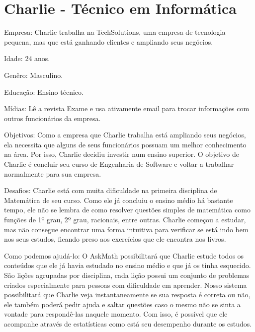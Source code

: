 \label{ap:personas}

\section{Charlie - Técnico em Informática}

\begin{figure}[h!]
  \centering
\end{figure}

Empresa: Charlie trabalha na TechSolutions, uma empresa de tecnologia pequena, mas que está ganhando
clientes e ampliando seus negócios.

Idade: 24 anos.

Genêro: Masculino.

Educação: Ensino técnico.

Mídias: Lê a revista Exame e usa ativamente email para trocar informações com 
outros funcionários da empresa.

Objetivos: Como a empresa que Charlie trabalha está ampliando seus negócios, ela
necessita que alguns de seus funcionários possuam um melhor conhecimento na 
área. Por isso, Charlie decidiu investir num ensino superior. O objetivo de Charlie é 
concluir seu curso de Engenharia de Software e voltar a trabalhar normalmente para sua empresa.

Desafios: Charlie está com muita dificuldade na primeira disciplina de Matemática de seu curso. Como ele já concluiu o ensino médio há bastante tempo, ele não se lembra de como resolver 
questões simples de matemática como funções de 1º grau, 2º grau, racionais, entre outras. Charlie começou a estudar, mas não consegue encontrar uma forma intuitiva para verificar se está indo bem nos 
seus estudos, ficando preso aos exercícios que ele encontra nos livros.

Como podemos ajudá-lo: O AskMath possibilitará que Charlie estude 
todos os conteúdos que ele j\'a havia estudado no ensino médio e que já os tinha esquecido. São lições agrupadas por disciplina, cada lição possui um conjunto de problemas criados especialmente para 
pessoas com dificuldade em aprender. Nosso sistema possibilitará que Charlie veja instantaneamente se sua resposta é correta ou não, ele também poderá pedir ajuda 
e saltar quest\~oes caso o mesmo não se sinta a vontade para respondê-las naquele 
momento. Com isso, é possível que ele acompanhe através de estatísticas como 
está seu desempenho durante os estudos.

